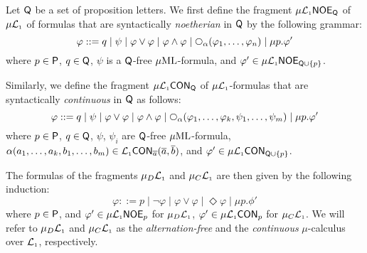 \begin{definition}
Let $\mathsf{Q}$ be a set  of proposition letters.
We first define the fragment $\mu\mathcal{L}_{\scriptscriptstyle 1}\mathsf{NOE}_{\mathsf{Q}}$ of $\mu\mathcal{L}_{\scriptscriptstyle 1}$ of 
formulas that are syntactically \emph{noetherian} in $\mathsf{Q}$ by the following 
grammar:
\begin{equation*}
   \varphi ::= q
   \mid \psi
   \mid \varphi \lor \varphi
   \mid \varphi \land \varphi
   \mid \nxt{\al}(\varphi_{1},\ldots,\varphi_{n})
   \mid \mu p.\phi'
\end{equation*}
where $p\in\mathsf{P}$, $q \in \mathsf{Q}$, $\psi$ is a $\mathsf{Q}$-free $\mu\mathrm{ML}$-formula,
and $\varphi' \in \mu\mathcal{L}_{\scriptscriptstyle 1}\mathsf{NOE}_{\mathsf{Q}\cup\{p\}}$. 

Similarly, we define the fragment $\mu\mathcal{L}_{\scriptscriptstyle 1}\mathsf{CON}_{\mathsf{Q}}$ of 
$\mu\mathcal{L}_{\scriptscriptstyle 1}$-formulas that are syntactically \emph{continuous} in $\mathsf{Q}$ as
follows:
\begin{equation*}
   \varphi ::= q
   \mid \psi
   \mid \varphi \lor \varphi
   \mid \varphi \land \varphi
   \mid 
   \nxt{\al}(\varphi_{1},\ldots,\varphi_{k},\psi_{1},\ldots,\psi_{m})
   \mid \mu p.\phi'
\end{equation*}
where $p\in\mathsf{P}$, $q \in \mathsf{Q}$, $\psi$, $\psi_{i}$ are $\mathsf{Q}$-free 
$\mu\mathrm{ML}$-formula, $\alpha(a_{1},\ldots,a_{k},b_{1},\ldots,b_{m}) \in 
\mathcal{L}_{\scriptscriptstyle 1}\mathsf{CON}_{\overline{a}}(\overline{a},\overline{b})$,
and $\varphi' \in \mu\mathcal{L}_{\scriptscriptstyle 1}\mathsf{CON}_{\mathsf{Q}\cup\{p\}}$. 

The formulas of the fragments $\mu_{D}\mathcal{L}_{\scriptscriptstyle 1}$ and $\mu_{C}\mathcal{L}_{\scriptscriptstyle 1}$ are then given
by the following induction:
\begin{equation*}
   \varphi ::= p \mid \lnot \varphi
    \mid \varphi \lor \varphi
    \mid  \Diamond \varphi
    \mid \mu p.\phi'
\end{equation*} 
where $p \in \mathsf{P}$, and $\varphi' \in \mu\mathcal{L}_{\scriptscriptstyle 1}\mathsf{NOE}_{p}$ for $\mu_{D}\mathcal{L}_{\scriptscriptstyle 1}$,
$\varphi' \in \mu\mathcal{L}_{\scriptscriptstyle 1}\mathsf{CON}_{p}$ for $\mu_{C}\mathcal{L}_{\scriptscriptstyle 1}$.
We will refer to $\mu_{D}\mathcal{L}_{\scriptscriptstyle 1}$ and $\mu_{C}\mathcal{L}_{\scriptscriptstyle 1}$ as the 
\emph{alternation-free} and the \emph{continuous} $\mu$-calculus over $\mathcal{L}_{\scriptscriptstyle 1}$,
respectively.
\end{definition}

